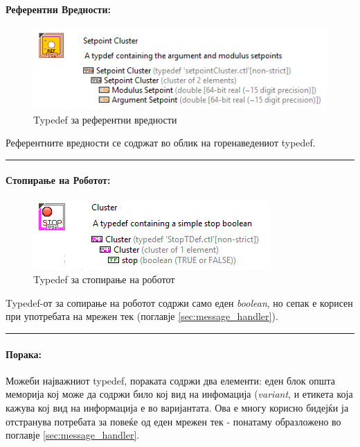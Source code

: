 \documentclass[12pt]{article}
\begin{document}
      \paragraph{Референтни Вредности:\\}
	      \begin{figure}[H]
	        \includegraphics[width=0.55\linewidth]{./images/typedef_setpoints_border.png}
		      \caption{Typedef за референтни вредности}
	        \label{fig:setpoints_typedef}
	        \raggedright
	        \end{figure}
	      Референтните вредности се содржат во облик на горенаведениот typedef.
        \textcolor[RGB]{150,150,150}{\rule{\linewidth}{1.6pt}}

      \paragraph{Стопирање на Роботот:\\}
	      \begin{figure}[H]
	        \includegraphics[width=0.55\linewidth]{./images/typedef_stop_border.png}
		      \caption{Typedef за стопирање на роботот}
	        \label{fig:setpoints_typedef}
	        \raggedright
	        \end{figure}
        Typedef-от за сопирање на роботот содржи само еден \textit{boolean}, но сепак е корисен при употребата на мрежен тек (поглавје \ref{sec:message_handler}).
        \textcolor[RGB]{150,150,150}{\rule{\linewidth}{1.6pt}}

      \paragraph{Порака:\\}
        Можеби најважниот typedef, пораката содржи два елементи: еден блок општа меморија кој може да содржи било кој вид на инфомација (\textit{variant}, и етикета која кажува кој вид на информација е во варијантата. Ова е многу корисно бидејќи ја отстранува потребата за повеќе од еден мрежен тек - понатаму образложено во поглавје \ref{sec:message_handler}.
\end{document}
